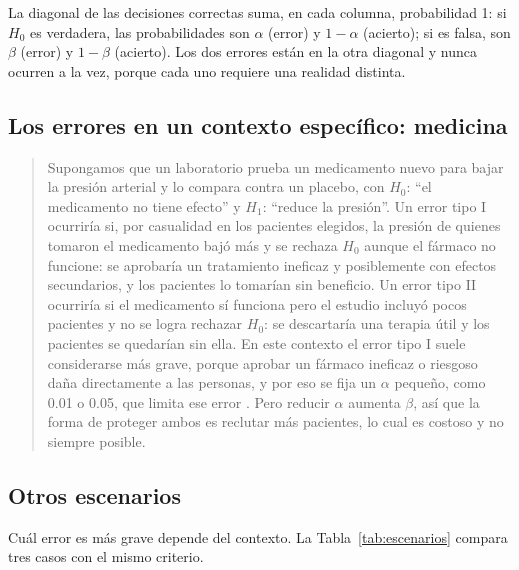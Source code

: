 \documentclass[11pt,letterpaper]{article}
\begin{document}
La diagonal de las decisiones correctas suma, en cada columna, probabilidad 1: si $H_0$ es verdadera, las probabilidades son $\alpha$ (error) y $1-\alpha$ (acierto); si es falsa, son $\beta$ (error) y $1-\beta$ (acierto). Los dos errores están en la otra diagonal y nunca ocurren a la vez, porque cada uno requiere una realidad distinta.

\subsection{Los errores en un contexto específico: medicina}

\begin{quote}
Supongamos que un laboratorio prueba un medicamento nuevo para bajar la presión arterial y lo compara contra un placebo, con $H_0$: ``el medicamento no tiene efecto'' y $H_1$: ``reduce la presión''. Un error tipo I ocurriría si, por casualidad en los pacientes elegidos, la presión de quienes tomaron el medicamento bajó más y se rechaza $H_0$ aunque el fármaco no funcione: se aprobaría un tratamiento ineficaz y posiblemente con efectos secundarios, y los pacientes lo tomarían sin beneficio. Un error tipo II ocurriría si el medicamento sí funciona pero el estudio incluyó pocos pacientes y no se logra rechazar $H_0$: se descartaría una terapia útil y los pacientes se quedarían sin ella. En este contexto el error tipo I suele considerarse más grave, porque aprobar un fármaco ineficaz o riesgoso daña directamente a las personas, y por eso se fija un $\alpha$ pequeño, como 0.01 o 0.05, que limita ese error \parencite{tecnm2026_documento_fuente}. Pero reducir $\alpha$ aumenta $\beta$, así que la forma de proteger ambos es reclutar más pacientes, lo cual es costoso y no siempre posible.
\end{quote}

\subsection{Otros escenarios}

Cuál error es más grave depende del contexto. La Tabla~\ref{tab:escenarios} compara tres casos con el mismo criterio.
\end{document}
